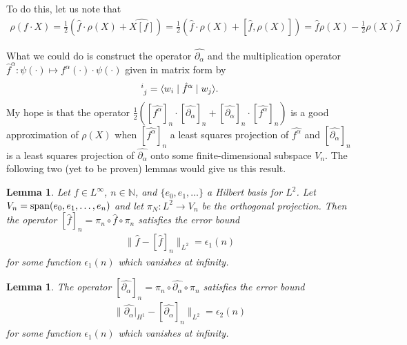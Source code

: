 \documentclass[12pt]{amsart}
\newtheorem{lem}[thm]{Lemma}
\begin{document}
To do this, let us note that
\begin{align*}
	\rho( f \cdot X) = \frac{1}{2} \left( \hat{f} \cdot \rho(X) + \widehat{X[f]}\right) = \frac{1}{2} \left( \hat{f} \cdot \rho(X) + [ \hat{f} , \rho(X)] \right) =  \hat{f} \rho(X) - \frac{1}{2} \rho(X) \hat{f}
\end{align*}

What we could do is construct the operator $\widehat{\partial_\alpha}$
and the multiplication operator $\hat{f}^\alpha: \psi(\cdot ) \mapsto f^\alpha(\cdot) \cdot \psi(\cdot)$ given in matrix form by
\begin{align*}
	[\hat{f}^\alpha]\indices{^i_j} = \langle w_i \mid \hat{f}^\alpha \mid w_j \rangle.
\end{align*}
My hope is that the operator $\frac{1}{2} ( [\widehat{f^\alpha}]_n \cdot [\widehat{\partial_\alpha}]_n + [\widehat{\partial_\alpha}]_n \cdot [\widehat{f^\alpha}]_n)$ is a good approximation of $\rho(X)$
when $[\widehat{f^\alpha}]_n$ a least squares projection of $\widehat{f^\alpha}$ and $[\widehat{\partial_\alpha}]_n$ is a least squares projection of $\widehat{\partial_\alpha}$ onto some finite-dimensional subspace $V_n$.  The following two (yet to be proven) lemmas would give us this result.

\begin{lem}
	Let $f \in L^{\infty}$, $n \in \mathbb{N}$, and
	$\{ e_0,e_1,\dots \}$ a Hilbert basis for $L^2$.
	Let $V_n = {\rm span}( e_0 , e_1,\dots,e_n)$ and let
	$\pi_N : L^2 \to V_n$ be the orthogonal projection.
	Then the operator $[\hat{f}]_n = \pi_n \circ \hat{f} \circ \pi_n$
	satisfies the error bound
	\begin{align*}
		\| \hat{f} - [\hat{f}]_n \|_{L^2} = \epsilon_1(n)
	\end{align*}
	for some function $\epsilon_1(n)$ which vanishes at infinity.
\end{lem}

\begin{lem}
	The operator $[\widehat{\partial_\alpha}]_n = \pi_n \circ \widehat{\partial_\alpha} \circ \pi_n$
	satisfies the error bound
	\begin{align*}
		\| \widehat{\partial_\alpha}|_{H^1} - [\widehat{\partial_\alpha}]_n \|_{L^2} = \epsilon_2(n)
	\end{align*}
	for some function $\epsilon_1(n)$ which vanishes at infinity.
\end{lem}
\end{document}
